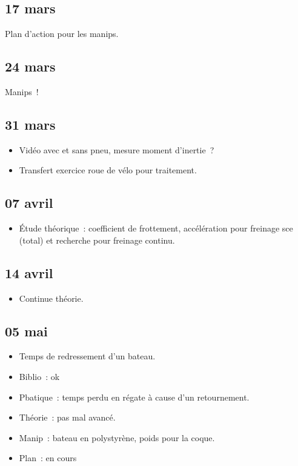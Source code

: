 \documentclass[a4paper, 11pt, final, garamond]{book}
\begin{document}
\subsection{17 mars}
\begin{center}
    Plan d'action pour les manips.
\end{center}

\subsection{24 mars}
\begin{center}
    \item Manips~!
\end{center}

\subsection{31 mars}
\begin{itemize}
  \item Vidéo avec et sans pneu, mesure moment d'inertie~?
  \item Transfert exercice roue de vélo pour traitement.
\end{itemize}

\subsection{07 avril}
\begin{itemize}
  \item Étude théorique~: coefficient de frottement, accélération pour freinage
    sce (total) et recherche pour freinage continu.
\end{itemize}

\subsection{14 avril}
\begin{itemize}
  \item Continue théorie.
\end{itemize}

\subsection{05 mai}
\begin{itemize}
  \item Temps de redressement d'un bateau.
  \item{Biblio}~: ok
  \item{Pbatique}~: temps perdu en régate à cause d'un retournement.
  \item{Théorie}~: pas mal avancé.
  \item{Manip}~: bateau en polystyrène, poids pour la coque.
  \item{Plan}~: en cours
\end{itemize}
\end{document}

